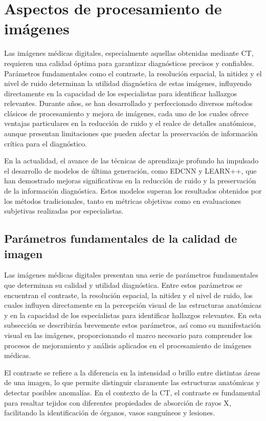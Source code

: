 \section{Aspectos de procesamiento de imágenes}

Las imágenes médicas digitales, especialmente aquellas obtenidas mediante CT, requieren una calidad óptima para garantizar diagnósticos precisos y confiables. Parámetros fundamentales como el contraste, la resolución espacial, la nitidez y el nivel de ruido determinan la utilidad diagnóstica de estas imágenes, influyendo directamente en la capacidad de los especialistas para identificar hallazgos relevantes. Durante años, se han desarrollado y perfeccionado diversos métodos clásicos de procesamiento y mejora de imágenes, cada uno de los cuales ofrece ventajas particulares en la reducción de ruido y el realce de detalles anatómicos, aunque presentan limitaciones que pueden afectar la preservación de información crítica para el diagnóstico.

En la actualidad, el avance de las técnicas de aprendizaje profundo ha impulsado el desarrollo de modelos de última generación, como EDCNN y LEARN++, que han demostrado mejoras significativas en la reducción de ruido y la preservación de la información diagnóstica. Estos modelos superan los resultados obtenidos por los métodos tradicionales, tanto en métricas objetivas como en evaluaciones subjetivas realizadas por especialistas.

\subsection{Parámetros fundamentales de la calidad de imagen}

Las imágenes médicas digitales presentan una serie de parámetros fundamentales que determinan su calidad y utilidad diagnóstica. Entre estos parámetros se encuentran el contraste, la resolución espacial, la nitidez y el nivel de ruido, los cuales influyen directamente en la percepción visual de las estructuras anatómicas y en la capacidad de los especialistas para identificar hallazgos relevantes. En esta subsección se describirán brevemente estos parámetros, así como su manifestación visual en las imágenes, proporcionando el marco necesario para comprender los procesos de mejoramiento y análisis aplicados en el procesamiento de imágenes médicas\cite{ImageProcessingBook}.

El contraste se refiere a la diferencia en la intensidad o brillo entre distintas áreas de una imagen, lo que permite distinguir claramente las estructuras anatómicas y detectar posibles anomalías. En el contexto de la CT, el contraste es fundamental para resaltar tejidos con diferentes propiedades de absorción de rayos X, facilitando la identificación de órganos, vasos sanguíneos y lesiones. 

